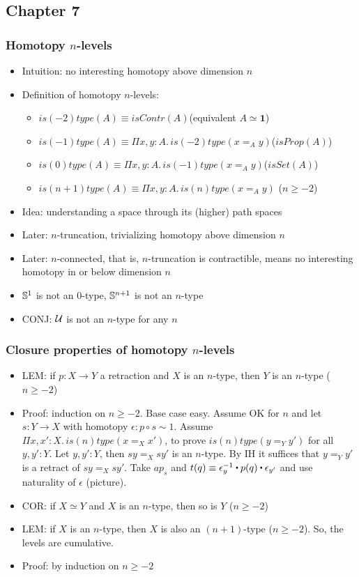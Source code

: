 \documentclass[handout]{beamer}
\newcommand{\depi}[3]{\Pi{#1{:}#2.\,#3}}
\newcommand{\UU}{{\cal U}}
\newcommand{\bfone}{\mathbf{1}}
\newcommand{\ct}{%
  \mathchoice{\mathbin{\raisebox{0.5ex}{$\displaystyle\centerdot$}}}%
             {\mathbin{\raisebox{0.5ex}{$\centerdot$}}}%
             {\mathbin{\raisebox{0.25ex}{$\scriptstyle\,\centerdot\,$}}}%
             {\mathbin{\raisebox{0.1ex}{$\scriptscriptstyle\,\centerdot\,$}}}
}
\begin{document}
    \subsection{Chapter 7}

 \frame
  {
    \frametitle{Homotopy $n$-levels}
    
\begin{itemize} 
    \item Intuition: no interesting homotopy above dimension $n$
    \item Definition of homotopy $n$-levels:
      \begin{itemize}[<+->] 
      \item $is(-2)type(A)\equiv isContr(A)$\quad(equivalent $A \simeq \bfone$)
      \item $is(-1)type(A)\equiv \depi{x,y}{A}{is(-2)type(x=_Ay)}$\quad  ($isProp(A)$)        
      \item $is(0)type(A)\equiv \depi{x,y}{A}{is(-1)type(x=_Ay)}$\quad   ($isSet(A)$)
      \item $is(n+1)type(A)\equiv \depi{x,y}{A}{is(n)type(x=_Ay)}$ ($n\geq-2$)
      \end{itemize}
    \item Idea: understanding a space through its (higher) path spaces  
    \item Later: $n$-truncation, trivializing homotopy above dimension $n$
    \item Later: $n$-connected, that is, $n$-truncation is contractible, means
             no interesting homotopy in or below dimension $n$
    \item $\mathbb{S}^1$ is not an $0$-type, $\mathbb{S}^{n+1}$ is not an $n$-type
    \item CONJ: $\UU$ is not an $n$-type for any $n$
\end{itemize}
  }
  
 \frame
  {
    \frametitle{Closure properties of homotopy $n$-levels}
    
\begin{itemize} 
    \item LEM: if $p:X\to Y$ a retraction and $X$ is an $n$-type, then $Y$ is an $n$-type ($n\geq-2$)
    \item Proof: induction on $n\geq-2$. Base case easy. Assume OK for $n$ and let $s:Y\to X$
              with homotopy $\epsilon: p\circ s \sim 1$. Assume $\depi{x,x'}{X}{is(n)type(x=_X x')}$,
              to prove ${is(n)type(y=_Y y')}$ for all ${y,y'}:{Y}$. Let $y,y':Y$, then $sy =_X sy'$ is an $n$-type.
              By IH it suffices that $y=_Y y'$ is a retract of $sy =_X sy'$. Take $ap_s$ and
              $t(q)\equiv \epsilon_y^{-1}\ct p(q)\ct \epsilon_{y'}$ and use naturality of $\epsilon$ (picture).
    \item COR: if $X\simeq Y$ and $X$ is an $n$-type, then so is $Y$ ($n\geq-2$)   
    \item LEM:  if $X$ is an $n$-type, then $X$ is also an $(n+1)$-type ($n\geq-2$).
              So, the levels are cumulative. 
    \item Proof: by induction on $n\geq-2$
\end{itemize}
  }
  
\end{document}

